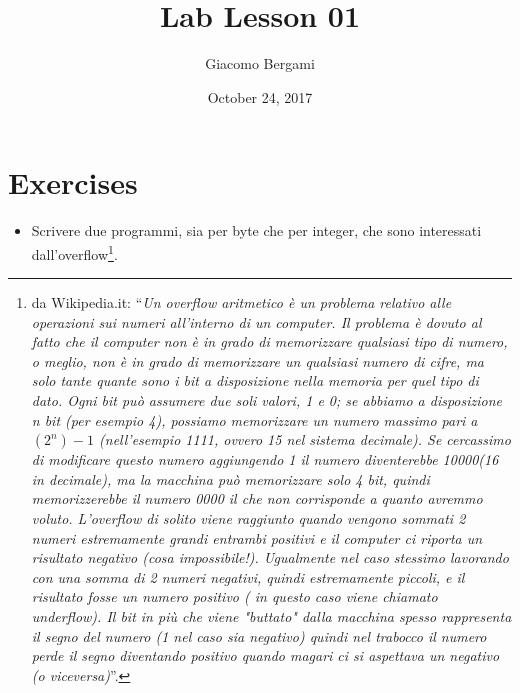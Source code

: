 \documentclass[]{scrartcl}
\title{Lab Lesson 01}
\date{October 24, 2017}
\author{Giacomo Bergami}
\begin{document}
\maketitle
\section*{Exercises}

\begin{itemize}
\item Scrivere due programmi, sia per byte che per integer, che sono interessati dall'overflow\footnote{da Wikipedia.it: ``\textit{Un overflow aritmetico è un problema relativo alle operazioni sui numeri all'interno di un computer. Il problema è dovuto al fatto che il computer non è in grado di memorizzare qualsiasi tipo di numero, o meglio, non è in grado di memorizzare un qualsiasi numero di cifre, ma solo tante quante sono i bit a disposizione nella memoria per quel tipo di dato. Ogni bit può assumere due soli valori, 1 e 0; se abbiamo a disposizione n bit (per esempio 4), possiamo memorizzare un numero massimo pari a $(2^n)-1$ (nell'esempio 1111, ovvero 15 nel sistema decimale). Se cercassimo di modificare questo numero aggiungendo 1 il numero diventerebbe 10000(16 in decimale), ma la macchina può memorizzare solo 4 bit, quindi memorizzerebbe il numero 0000 il che non corrisponde a quanto avremmo voluto. L'overflow di solito viene raggiunto quando vengono sommati 2 numeri estremamente grandi entrambi positivi e il computer ci riporta un risultato negativo (cosa impossibile!). Ugualmente nel caso stessimo lavorando con una somma di 2 numeri negativi, quindi estremamente piccoli, e il risultato fosse un numero positivo ( in questo caso viene chiamato underflow). Il bit in più che viene "buttato" dalla macchina spesso rappresenta il segno del numero (1 nel caso sia negativo) quindi nel trabocco il numero perde il segno diventando positivo quando magari ci si aspettava un negativo (o viceversa)}''.}.


\end{itemize}
\end{document}

